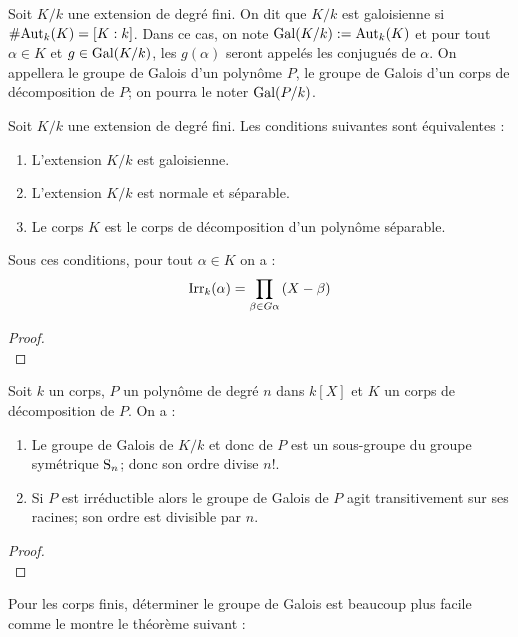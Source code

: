 \documentclass[a4paper]{article} %
\numberwithin{section}{part}
\numberwithin{equation}{section}
\newcommand\Irr[2]{\textup{Irr}_{#1}(#2)}
\begin{document}
\begin{defn}
\label{def:gal}
Soit $K/k$ une extension de degré fini. On dit que $K/k$ est galoisienne si
$\#\textup{Aut}_k(K) = [K:k]$. Dans ce cas, on note $\textup{Gal}(K/k) :=
\textup{Aut}_k(K)$ et pour tout $\alpha\in K$ et $g\in\textup{Gal}(K/k)$, les
$g(\alpha)$ seront appelés les conjugués de $\alpha$.
On appellera le groupe de Galois d'un polynôme $P$, le groupe de Galois d'un
corps de décomposition de $P$; on pourra le noter $\textup{Gal}(P/k)$.
\end{defn}

\begin{thm}
Soit $K/k$ une extension de degré fini. Les conditions suivantes sont
équivalentes :
\begin{enumerate}
\item L'extension $K/k$ est galoisienne.
\item L'extension $K/k$ est normale et séparable.
\item Le corps $K$ est le corps de décomposition d'un polynôme séparable.
\end{enumerate}
Sous ces conditions, pour tout $\alpha\in K$ on a :
\[\Irr{k}{\alpha} = \prod_{\beta\in G\alpha}{(X - \beta)}\]
\end{thm}
\begin{proof}
\cite[Chap. VIII, p.~169]{Pol}\\
\end{proof}


\begin{thm} Soit $k$ un corps, $P$ un polynôme de degré $n$ dans $k[X]$ et $K$ 
un corps de décomposition de $P$. On a :
\begin{enumerate}
\item Le groupe de Galois de $K/k$ et donc de $P$ est un sous-groupe du groupe
symétrique $\textup{S}_n$; donc son ordre divise $n!$.
\item Si $P$ est irréductible alors le groupe de Galois de $P$ agit
transitivement sur ses racines; son ordre est divisible par $n$.
\end{enumerate}
\end{thm}
\begin{proof}
\cite[Chap. IX, p.~206]{Pol}\\
\end{proof}

Pour les corps finis, déterminer le groupe de Galois est beaucoup plus facile
comme le montre le théorème suivant :
\end{document}
